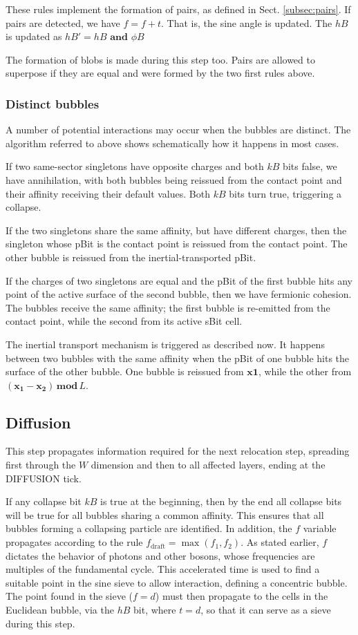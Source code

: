\documentclass[12pt,english]{article}
\begin{document}
These rules implement the formation of pairs, as defined in Sect. \ref{subsec:pairs}. If pairs are detected, we have $f=f+t$. That is, the sine angle is updated. The $hB$ is updated as $hB'=hB$ $\textbf{and}$ $\phi B$

The formation of blobs is made during this step too. Pairs are allowed to superpose if they are equal and were formed by the two first rules above.

\subsubsection{Distinct bubbles} \label{subsec:distinct}
A number of potential interactions may occur when the bubbles are distinct. The algorithm referred to above shows schematically how it happens in most cases.

If two same-sector singletons have opposite charges and both $kB$ bits false, we have annihilation, with both bubbles being reissued from the contact point and their affinity receiving their default values. Both $kB$ bits turn true, triggering a collapse.

If the two singletons share the same affinity, but have different charges, then the singleton whose pBit is the contact point is reissued from the contact point. The other bubble is reissued from the inertial-transported pBit.

If the charges of two singletons are equal and the pBit of the first bubble hits any point of the active surface of the second bubble, then we have fermionic cohesion. The bubbles receive the same affinity; the first bubble is re-emitted from the contact point, while the second from its active sBit cell.

The inertial transport mechanism is triggered as described now. It happens between two bubbles with the same affinity when the pBit of one bubble hits the surface of the other bubble. One bubble is reissued from $\boldsymbol{x1}$, while the other from $(\boldsymbol{x_1}-\boldsymbol{x_2})\,\boldsymbol{mod}\,L$.

\subsection{Diffusion}

This step propagates information required for the next relocation step, spreading first through the \(W\) dimension and then to all affected layers, ending at the DIFFUSION tick.

If any collapse bit \(kB\) is true at the beginning, then by the end all collapse bits will be true for all bubbles sharing a common affinity. This ensures that all bubbles forming a collapsing particle are identified. In addition, the \(f\) variable propagates according to the rule \(f_{\text{draft}} = \max(f_1,f_2)\). As stated earlier, \(f\) dictates the behavior of photons and other bosons, whose frequencies are multiples of the fundamental cycle. This accelerated time is used to find a suitable point in the sine sieve to allow interaction, defining a concentric bubble. The point found in the sieve (\(f=d\)) must then propagate to the cells in the Euclidean bubble, via the \(hB\) bit, where \(t=d\), so that it can serve as a sieve during this step.
\end{document}
